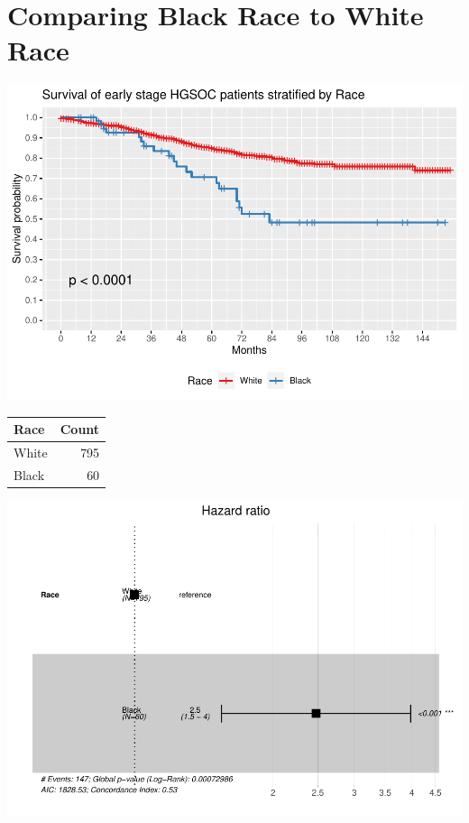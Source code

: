 \documentclass[
]{article}
\begin{document}
\hypertarget{comparing-black-race-to-white-race}{%
\section{Comparing Black Race to White
Race}\label{comparing-black-race-to-white-race}}

\includegraphics{EarlyOvaryRace_files/figure-latex/unnamed-chunk-4-1.pdf}

\begin{tabular}[t]{l|r}
\hline
Race & Count\\
\hline
White & 795\\
\hline
Black & 60\\
\hline
\end{tabular}

\includegraphics{EarlyOvaryRace_files/figure-latex/unnamed-chunk-5-1.pdf}
\end{document}
